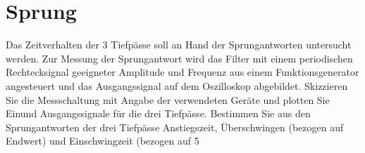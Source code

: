 \section{Sprung}
Das Zeitverhalten der 3 Tiefpässe soll an Hand der Sprungantworten untersucht werden. Zur Messung der Sprungantwort wird das Filter mit einem periodischen Rechtecksignal geeigneter Amplitude und Frequenz aus einem Funktionsgenerator angesteuert und das Ausgangssignal auf dem Oszilloskop abgebildet.
 Skizzieren Sie die Messschaltung mit Angabe der verwendeten Geräte und plotten Sie Einund Ausgangssignale für die drei Tiefpässe. Bestimmen Sie aus den Sprungantworten der drei Tiefpässe Anstiegszeit, Überschwingen (bezogen auf Endwert) und Einschwingzeit (bezogen auf 5%


